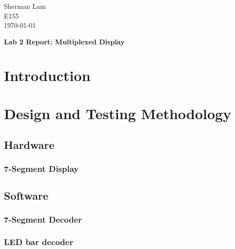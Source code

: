 \documentclass[11pt]{article}
\begin{document}
\begin{flushleft}
Sherman Lam
\\E155
\\ \today
\end{flushleft}


\begin{center}
\begin{Large}
\textbf{Lab 2 Report: Multiplexed Display}
\end{Large}
\end{center}




\section{Introduction}
\label{sec:intro}



\section{Design and Testing Methodology}

\subsection{Hardware}


\subsubsection{7-Segment Display}



\subsection{Software}

\subsubsection{7-Segment Decoder}
\label{sec:software_7seg}


\subsubsection{LED bar decoder}
\label{sec:software_LEDbar}
\end{document}
